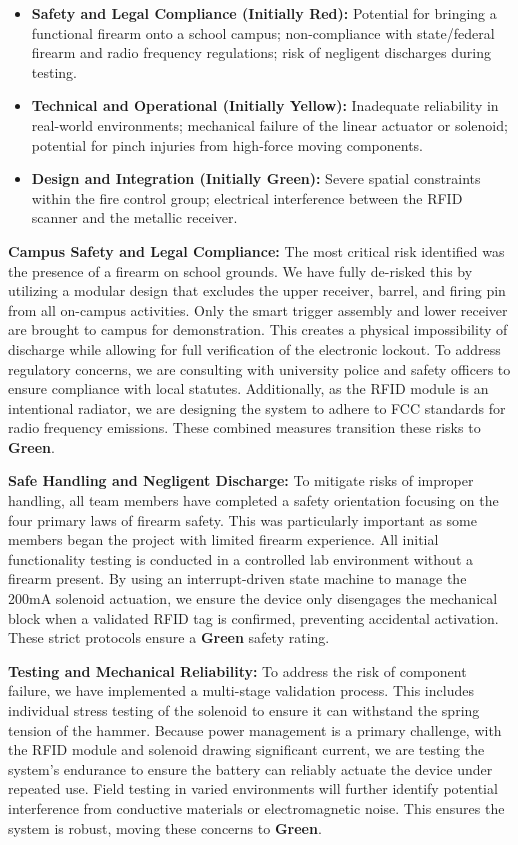 \begin{itemize}
    \item \textbf{Safety and Legal Compliance (Initially Red):} Potential for bringing a functional firearm onto a school campus; non-compliance with state/federal firearm and radio frequency regulations; risk of negligent discharges during testing.
    \item \textbf{Technical and Operational (Initially Yellow):} Inadequate reliability in real-world environments; mechanical failure of the linear actuator or solenoid; potential for pinch injuries from high-force moving components.
    \item \textbf{Design and Integration (Initially Green):} Severe spatial constraints within the fire control group; electrical interference between the RFID scanner and the metallic receiver.
\end{itemize}

\textbf{Campus Safety and Legal Compliance:} The most critical risk identified was the presence of a firearm on school grounds. We have fully de-risked this by utilizing a modular design that excludes the upper receiver, barrel, and firing pin from all on-campus activities. Only the smart trigger assembly and lower receiver are brought to campus for demonstration. This creates a physical impossibility of discharge while allowing for full verification of the electronic lockout. To address regulatory concerns, we are consulting with university police and safety officers to ensure compliance with local statutes. Additionally, as the RFID module is an intentional radiator, we are designing the system to adhere to FCC standards for radio frequency emissions. These combined measures transition these risks to \textbf{Green}.

\textbf{Safe Handling and Negligent Discharge:} To mitigate risks of improper handling, all team members have completed a safety orientation focusing on the four primary laws of firearm safety. This was particularly important as some members began the project with limited firearm experience. All initial functionality testing is conducted in a controlled lab environment without a firearm present. By using an interrupt-driven state machine to manage the 200mA solenoid actuation, we ensure the device only disengages the mechanical block when a validated RFID tag is confirmed, preventing accidental activation. These strict protocols ensure a \textbf{Green} safety rating.

\textbf{Testing and Mechanical Reliability:} To address the risk of component failure, we have implemented a multi-stage validation process. This includes individual stress testing of the solenoid to ensure it can withstand the spring tension of the hammer. Because power management is a primary challenge, with the RFID module and solenoid drawing significant current, we are testing the system's endurance to ensure the battery can reliably actuate the device under repeated use. Field testing in varied environments will further identify potential interference from conductive materials or electromagnetic noise. This ensures the system is robust, moving these concerns to \textbf{Green}.

